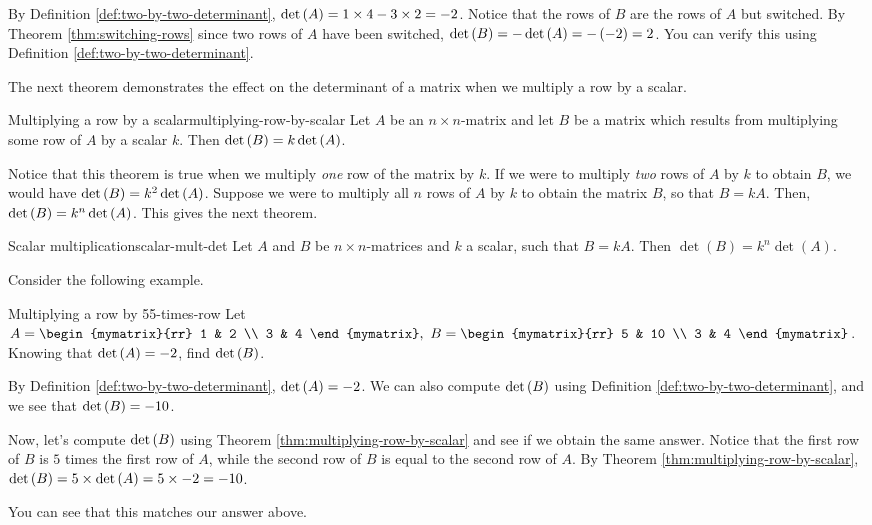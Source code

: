 \begin{solution}
By Definition \ref{def:two-by-two-determinant}, 
$\det \left(A\right) = 1 \times 4 - 3 \times 2 = -2$. 
Notice that the rows of $B$ are the rows of $A$ but switched. 
By Theorem \ref{thm:switching-rows} since two rows of $A$ have been switched,
$\det \left(B\right) = - \det \left(A\right) = - \left(-2\right) = 2$.
You can verify this using Definition \ref{def:two-by-two-determinant}. 
\end{solution}

The next theorem demonstrates the effect on the determinant of a matrix when we multiply
a row by a scalar.

\begin{theorem}{Multiplying a row by a scalar}{multiplying-row-by-scalar}
Let $A$ be an $n\times n$-matrix and let $B$ be a matrix
which results from multiplying some row of $A$ by a scalar $k$. Then $\det
\left(B\right) = k \det \left(A\right)$.
\end{theorem}

Notice that this theorem is true when we multiply {\em one\em} row of the matrix by $k$.
If we were to multiply {\em two\em} rows of $A$ by $k$ to obtain $B$, we would have
$\det \left(B\right) = k^2 \det \left(A\right)$.
Suppose we were to multiply all $n$ rows of $A$ by $k$ to obtain the matrix $B$, so that 
$B = kA$. Then, $\det \left(B\right) = k^n \det \left(A\right)$. This gives the next theorem.

\begin{theorem}{Scalar multiplication}{scalar-mult-det}
Let $A$ and $B$ be $n \times n$-matrices and $k$ a scalar, such that $B = kA$. Then $\det(B) = k^n \det(A)$.
\end{theorem}

Consider the following example.

\begin{example}{Multiplying a row by 5}{5-times-row}
Let $A=\begin{mymatrix}{rr}
1 & 2 \\
3 & 4
\end{mymatrix} ,\ B=\begin{mymatrix}{rr}
5 & 10 \\
3 & 4
\end{mymatrix}$. 
Knowing that $\det \left(A \right) =-2$, find  $\det \left(B \right)$.
\end{example}

\begin{solution} 
By Definition \ref{def:two-by-two-determinant}, $\det \left(A\right) =-2$. We can also compute
$\det \left(B\right)$ using Definition \ref{def:two-by-two-determinant}, and we see that $\det \left(B\right) = -10$. 

Now, let's compute  $\det \left(B\right)$ using Theorem \ref{thm:multiplying-row-by-scalar} and see if we
obtain the same answer. Notice that the first row of $B$ is $5$ times the first row of $A$, while the
second row of $B$ is equal to the second row of $A$. 
By Theorem \ref{thm:multiplying-row-by-scalar}, 
$\det  \left(B \right) = 5 \times \det \left(A \right) = 5 \times -2 = -10$.

You can see that this matches our answer above.
\end{solution}

